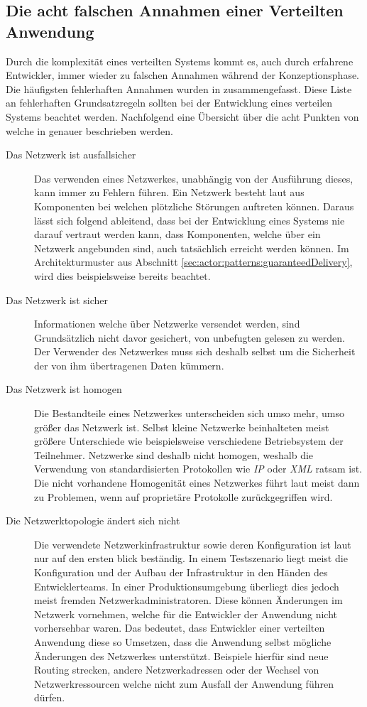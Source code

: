\subsection{Die acht falschen Annahmen einer Verteilten Anwendung}\label{sec:distributedSystems:wrongAssumptions} 
Durch die komplexität eines verteilten Systems kommt es, auch durch erfahrene Entwickler, immer wieder zu falschen Annahmen während der Konzeptionsphase. Die häufigsten fehlerhaften Annahmen wurden in \cite{deutsch1994eight} zusammengefasst. Diese Liste an fehlerhaften Grundsatzregeln sollten bei der Entwicklung eines verteilen Systems beachtet werden. Nachfolgend eine Übersicht über die acht Punkten von \cite{deutsch1994eight} welche in \cite{rotem2006fallacies} genauer beschrieben werden.
\begin{description}
    \item[Das Netzwerk ist ausfallsicher]
    Das verwenden eines Netzwerkes, unabhängig von der Ausführung dieses, kann immer zu Fehlern führen. Ein Netzwerk besteht laut \cite{rotem2006fallacies} aus Komponenten bei welchen plötzliche Störungen auftreten können. Daraus lässt sich folgend ableitend, dass bei der Entwicklung eines Systems nie darauf vertraut werden kann, dass Komponenten, welche über ein Netzwerk angebunden sind, auch tatsächlich erreicht werden können. Im Architekturmuster aus Abschnitt \ref{sec:actor:patterns:guaranteedDelivery}, wird dies beispielsweise bereits beachtet.
    \item[Das Netzwerk ist sicher]
    Informationen welche über Netzwerke versendet werden, sind Grundsätzlich nicht davor gesichert, von unbefugten gelesen zu werden. Der Verwender des Netzwerkes muss sich deshalb selbst um die Sicherheit der von ihm übertragenen Daten kümmern.
    \item[Das Netzwerk ist homogen]
    Die Bestandteile eines Netzwerkes unterscheiden sich umso mehr, umso größer das Netzwerk ist. Selbst kleine Netzwerke beinhalteten meist größere Unterschiede wie beispielsweise verschiedene Betriebsystem der Teilnehmer. Netzwerke sind deshalb nicht homogen, weshalb die Verwendung von standardisierten Protokollen wie  \textit{IP} oder \textit{XML} ratsam ist. Die nicht vorhandene Homogenität eines Netzwerkes führt laut \cite{rotem2006fallacies} meist dann zu Problemen, wenn auf proprietäre Protokolle zurückgegriffen wird.
    \item[Die Netzwerktopologie ändert sich nicht]
    Die verwendete Netzwerkinfrastruktur sowie deren Konfiguration ist laut \cite{rotem2006fallacies} nur auf den ersten blick beständig. In einem Testszenario liegt meist die Konfiguration und der Aufbau der Infrastruktur in den Händen des Entwicklerteams. In einer Produktionsumgebung überliegt dies jedoch meist fremden Netzwerkadministratoren. Diese können Änderungen im Netzwerk vornehmen, welche für die Entwickler der Anwendung nicht vorhersehbar waren. Das bedeutet, dass Entwickler einer verteilten Anwendung diese so Umsetzen, dass die Anwendung selbst mögliche Änderungen des Netzwerkes unterstützt.  Beispiele hierfür sind neue Routing strecken, andere Netzwerkadressen oder der Wechsel von Netzwerkressourcen welche nicht zum Ausfall der Anwendung führen dürfen. 

\end{description}
